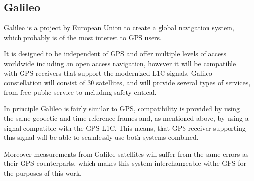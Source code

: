 \subsection{Galileo}
\label{sec:galileo}

Galileo \cite{galileo} is a project by European Union to create a global navigation system, which
probably is of the most interest to GPS users.

It is designed to be independent of GPS and offer multiple levels of access worldwide
including an open access navigation, however
it will be compatible with GPS receivers that support the modernized L1C signals.
Galileo constellation will consist of 30 satellites, and will provide several types of services,
from free public service to including safety-critical.

In principle Galileo is fairly similar to GPS,
compatibility is provided by using the same geodetic and time reference frames
and, as mentioned above, by using a signal compatible with the GPS L1C.
This means, that GPS receiver supporting this signal will be able to seamlessly
use both systems combined.

Moreover measurements from Galileo satellites will suffer from the same errors as
their GPS counterparts, which makes this system interchangeable withe GPS for the purposes
of this work.
